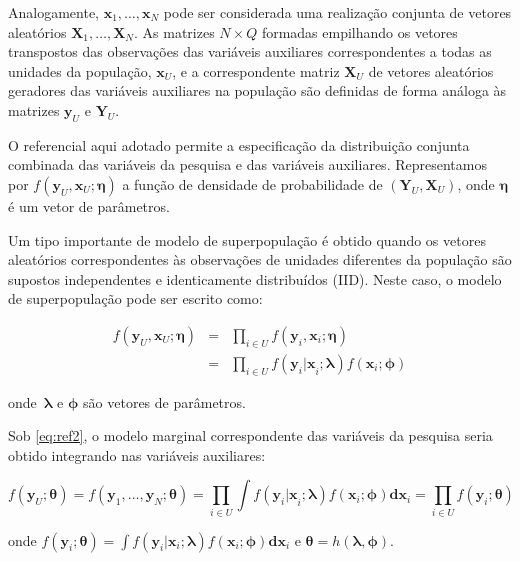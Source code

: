 \documentclass[]{book}
\theoremstyle{definition}
\theoremstyle{definition}
\theoremstyle{definition}
\theoremstyle{remark}
\begin{document}
Analogamente, \(\mathbf{x}_1 ,\ldots, \mathbf{x}_N\) pode ser
considerada uma realização conjunta de vetores aleatórios
\(\mathbf{X}_1 ,\ldots, \mathbf{X}_N\). As matrizes \(N \times Q\)
formadas empilhando os vetores transpostos das observações das variáveis
auxiliares correspondentes a todas as unidades da população,
\(\mathbf{x}_{U}\), e a correspondente matriz \(\mathbf{X}_{U}\) de
vetores aleatórios geradores das variáveis auxiliares na população são
definidas de forma análoga às matrizes \(\mathbf{y}_{U}\) e
\(\mathbf{Y}_{U}\).

O referencial aqui adotado permite a especificação da distribuição
conjunta combinada das variáveis da pesquisa e das variáveis auxiliares.
Representamos por \(f( \mathbf{y}_U , \mathbf{x}_U ; \mathbf{\eta} )\) a
função de densidade de probabilidade de
\(( \mathbf{Y}_U , \mathbf{X}_U )\), onde \(\mathbf{\eta}\) é um vetor
de parâmetros.

Um tipo importante de modelo de superpopulação é obtido quando os
vetores aleatórios correspondentes às observações de unidades diferentes
da população são supostos independentes e identicamente distribuídos
(IID). Neste caso, o modelo de superpopulação pode ser escrito como:

\begin{eqnarray}
f \left( \mathbf{y}_U , \mathbf{x}_U ; \mathbf{\eta} \right) 
&=&\prod_{i\in U} f\left(\mathbf{y}_i , \mathbf{x}_i ; \mathbf{\eta} \right) \label{eq:ref1} \\
&=&\prod_{i\in U} f\left( \mathbf{y}_i \mathbf{|x}_i ; \mathbf{\lambda} \right) 
f\left( \mathbf{x}_i ; \mathbf{\phi} \right) \label{eq:ref2}
\end{eqnarray}

onde~\(\mathbf{\lambda}\) e \(\mathbf{\phi}\) são vetores de parâmetros.

Sob \eqref{eq:ref2}, o modelo marginal correspondente das variáveis da
pesquisa seria obtido integrando nas variáveis auxiliares:

\begin{equation}
f(\mathbf{y}_U ; \mathbf{\theta}) = f(\mathbf{y}_1 ,\ldots ,\mathbf{y}_N ; \mathbf{\theta}) = \prod_{i\in U} \int f\left( \mathbf{y}_i \mathbf{|x}_i ; \mathbf{\lambda} \right) f\left( \mathbf{x}_i ; \mathbf{\phi} \right) \mathbf{dx}_i = \prod_{i\in U} f\left( \mathbf{y}_i ; \mathbf{\theta} \right) \label{eq:ref3}
\end{equation}

onde
\(f\left( \mathbf{y}_i ; \mathbf{\theta} \right) = \int f\left( \mathbf{y}_i | \mathbf{x}_i ; \mathbf{\lambda} \right) f\left( \mathbf{x}_i ; \mathbf{\phi} \right) \mathbf{dx}_i\)
e
\(\mathbf{\theta =} h\left( \mathbf{\lambda} , \mathbf{\phi} \right)\).
\end{document}
